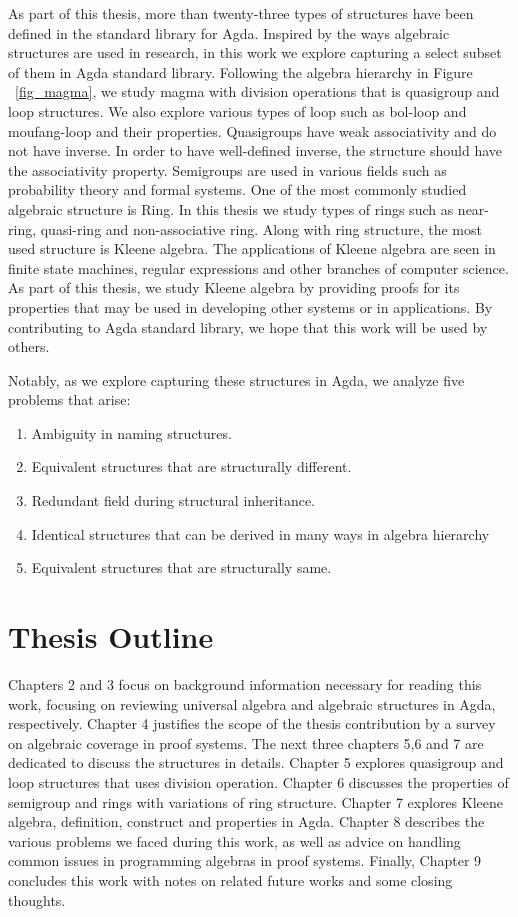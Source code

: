 As part of this thesis, more than twenty-three types of structures have been
defined in the standard library for Agda. Inspired by the ways algebraic
structures are used in research, in this work we explore capturing a select
subset of them in Agda standard library. Following the algebra hierarchy in
Figure ~\ref{fig_magma}, we study magma with division operations that is
quasigroup and loop structures. We also explore various types of loop such as
bol-loop and moufang-loop and their properties. Quasigroups have weak
associativity and do not have inverse. In order to have well-defined inverse,
the structure should have the associativity property. Semigroups are used in
various fields such as probability theory and formal systems. One of the most
commonly studied algebraic structure is Ring. In this thesis we study types of
rings such as near-ring, quasi-ring and non-associative ring. Along with ring
structure, the most used structure is Kleene algebra. The applications of Kleene
algebra are seen in finite state machines, regular expressions and other branches
of computer science. As part of this thesis, we study Kleene algebra by
providing proofs for its properties that may be used in developing other systems
or in applications. By contributing to Agda standard library, we hope that this
work will be used by others. 

Notably, as we explore capturing these structures in Agda, we analyze five problems that arise:
\begin{enumerate}
\item Ambiguity in naming structures.
\item Equivalent structures that are structurally different.
\item Redundant field during structural inheritance.
\item Identical structures that can be derived in many ways in algebra hierarchy
\item Equivalent structures that are structurally same.
\end{enumerate}

\section{Thesis Outline}
Chapters 2 and 3 focus on background information necessary for reading this
work, focusing on reviewing universal algebra and algebraic structures in Agda,
respectively. Chapter 4 justifies the scope of the thesis contribution by a
survey on algebraic coverage in proof systems. The next three chapters 5,6 and 7
are dedicated to discuss the structures in details. Chapter 5 explores
quasigroup and loop structures that uses division operation. Chapter 6 discusses
the properties of semigroup and rings with variations of ring structure. Chapter
7 explores Kleene algebra, definition, construct and properties in Agda. Chapter
8 describes the various problems we faced during this work, as well as advice on
handling common issues in programming algebras in proof systems. Finally,
Chapter 9 concludes this work with notes on related future works and some
closing thoughts.
